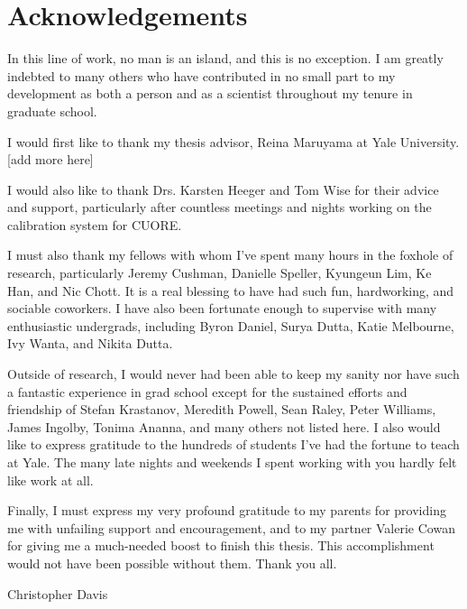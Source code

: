 \chapter*{Acknowledgements}
In this line of work, no man is an island, and this is no exception. I am greatly indebted to many others who have contributed in no small part to my development as both a person and as a scientist throughout my tenure in graduate school.

I would first like to thank my thesis advisor, Reina Maruyama at Yale University. [add more here]

I would also like to thank Drs. Karsten Heeger and Tom Wise for their advice and support, particularly after countless meetings and nights working on the calibration system for CUORE.

I must also thank my fellows with whom I've spent many hours in the foxhole of research, particularly Jeremy Cushman, Danielle Speller, Kyungeun Lim, Ke Han, and Nic Chott. It is a real blessing to have had such fun, hardworking, and sociable coworkers. I have also been fortunate enough to supervise with many enthusiastic undergrads, including Byron Daniel, Surya Dutta, Katie Melbourne, Ivy Wanta, and Nikita Dutta.

Outside of research, I would never had been able to keep my sanity nor have such a fantastic experience in grad school except for the sustained efforts and friendship of Stefan Krastanov, Meredith Powell, Sean Raley, Peter Williams, James Ingolby, Tonima Ananna, and many others not listed here. I also would like to express gratitude to the hundreds of students I've had the fortune to teach at Yale. The many late nights and weekends I spent working with you hardly felt like work at all.

Finally, I must express my very profound gratitude to my parents for providing me with unfailing support and encouragement, and to my partner Valerie Cowan for giving me a much-needed boost to finish this thesis. This accomplishment would not have been possible without them. Thank you all.

Christopher Davis
